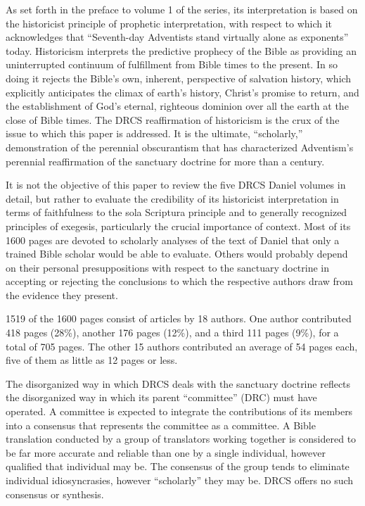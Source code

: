 As set forth in the preface to volume 1 of the series, its interpretation is
based on the historicist principle of prophetic interpretation, with respect
to which it acknowledges that ``Seventh-day Adventists stand virtually alone
as exponents'' today. Historicism interprets the predictive prophecy of the
Bible as providing an uninterrupted continuum of fulfillment from Bible
times to the present. In so doing it rejects the Bible's own, inherent,
perspective of salvation history, which explicitly anticipates the climax of
earth's history, Christ's promise to return, and the establishment of God's
eternal, righteous dominion over all the earth at the close of Bible
times.\noteXXXV{} The DRCS reaffirmation of historicism is the crux of the issue to
which this paper is addressed. It is the ultimate, ``scholarly,''
demonstration of the perennial obscurantism that has characterized
Adventism's perennial reaffirmation of the sanctuary doctrine for more than
a century.

It is not the objective of this paper to review the five DRCS Daniel volumes
in detail, but rather to evaluate the credibility of its historicist
interpretation in terms of faithfulness to the sola Scriptura principle and
to generally recognized principles of exegesis, particularly the crucial
importance of context. Most of its 1600 pages are devoted to scholarly
analyses of the text of Daniel that only a trained Bible scholar would be
able to evaluate. Others would probably depend on their personal
presuppositions with respect to the sanctuary doctrine in accepting or
rejecting the conclusions to which the respective authors draw from the
evidence they present.

1519 of the 1600 pages consist of articles by 18 authors. One author
contributed 418 pages (28\%), another 176 pages (12\%), and a third 111 pages
(9\%), for a total of 705 pages. The other 15 authors contributed an average
of 54 pages each, five of them as little as 12 pages or less.

The disorganized way in which DRCS deals with the sanctuary doctrine
reflects the disorganized way in which its parent ``committee'' (DRC) must
have operated. A committee is expected to integrate the contributions of its
members into a consensus that represents the committee as a committee. A
Bible translation conducted by a group of translators working together is
considered to be far more accurate and reliable than one by a single
individual, however qualified that individual may be. The consensus of the
group tends to eliminate individual idiosyncrasies, however ``scholarly'' they
may be. DRCS offers no such consensus or synthesis.

